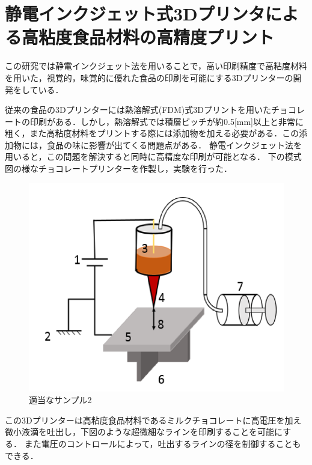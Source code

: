 \section{静電インクジェット式3Dプリンタによる高粘度食品材料の高精度プリント\cite{e}}
\label{sec:enum}
この研究では静電インクジェット法を用いることで，高い印刷精度で高粘度材料を用いた，視覚的，味覚的に優れた食品の印刷を可能にする3Dプリンターの開発をしている．

従来の食品の3Dプリンターには熱溶解式(FDM)式3Dプリントを用いたチョコレートの印刷がある．しかし，熱溶解式では積層ピッチが約0.5[mm]以上と非常に粗く，また高粘度材料をプリントする際には添加物を加える必要がある．この添加物には，食品の味に影響が出てくる問題点がある．
静電インクジェット法を用いると，この問題を解決すると同時に高精度な印刷が可能となる．
下の模式図の様なチョコレートプリンターを作製し，実験を行った．


\begin{figure}[H]
  \centering
  \includegraphics[width=11truecm]{./fig/静電インクジェット.png}
  \caption{適当なサンプル2}
  \label{fig:ferret}
\end{figure}

この3Dプリンターは高粘度食品材料であるミルクチョコレートに高電圧を加え微小液滴を吐出し，下図のような超微細なラインを印刷することを可能にする．
また電圧のコントロールによって，吐出するラインの径を制御することもできる．


